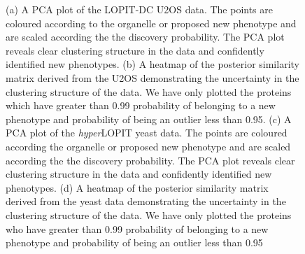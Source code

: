 \documentclass[12pt,english]{article}
\begin{document}
\begin{figure}
\begin{subfigure}[t]{0.5\textwidth}
	\caption{}
\end{subfigure}
\caption{(a) A PCA plot of the LOPIT-DC U2OS data. The points are coloured according to the organelle or proposed new phenotype and are scaled according the the discovery probability. The PCA plot reveals clear clustering structure in the data and confidently identified new phenotypes. (b) A heatmap of the posterior similarity matrix derived from the U2OS demonstrating the uncertainty in the clustering structure of the data. We have only plotted the proteins which have greater than 0.99 probability of belonging to a new phenotype and probability of being an outlier less than 0.95. (c) A PCA plot of the \textit{hyper}LOPIT yeast data. The points are coloured according the organelle or proposed new phenotype and are scaled according the the discovery probability. The PCA plot reveals clear clustering structure in the data and confidently identified new phenotypes. (d)  A heatmap of the posterior similarity matrix derived from the yeast data demonstrating the uncertainty in the clustering structure of the data. We have only plotted the proteins who have greater than 0.99 probability of belonging to a new phenotype and probability of being an outlier less than 0.95}
 \label{figure:DC}
\end{figure}
\end{document}
